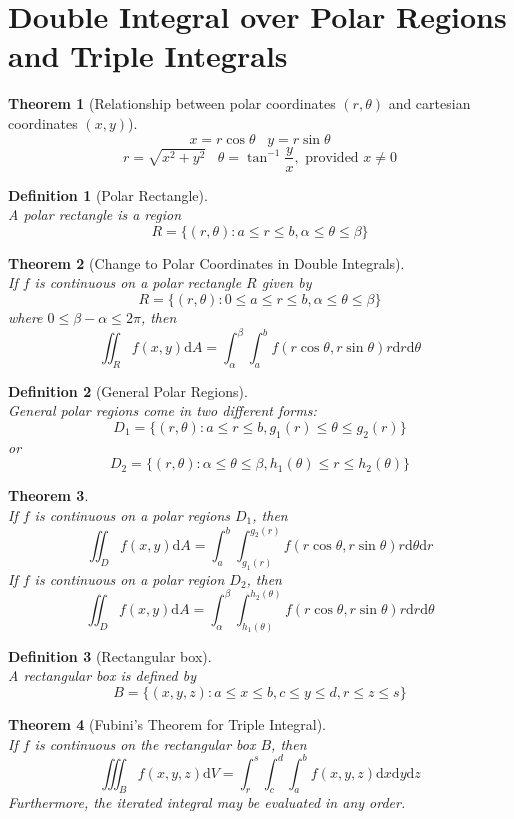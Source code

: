 \documentclass[12pt]{article}
\newtheorem{definition}{Definition}[section]
\newtheorem{theorem}{Theorem}[section]
\theoremstyle{definition}
\newcommand{\diff}{\mathrm{d}}
\begin{document}
\section{Double Integral over Polar Regions and Triple Integrals}
\begin{theorem}[Relationship between polar coordinates $(r,\theta)$ and cartesian coordinates $(x,y)$]
\[
x = r\cos\theta \;\;\; y = r\sin\theta
\]
\[r = \sqrt{x^2+y^2}\;\;\; \theta = \tan^{-1}\frac{y}{x},\text{ provided }x\neq 0
\]
\end{theorem}
\begin{definition}[Polar Rectangle]
\hfill\\\normalfont A polar rectangle is a region
\[
R=\{(r,\theta): a\leq r\leq b, \alpha\leq \theta\leq \beta\}
\]
\end{definition}
\begin{theorem}[Change to Polar Coordinates in Double Integrals]
\hfill\\\normalfont If $f$ is continuous on a polar rectangle $R$ given by
\[
R=\{(r,\theta): 0\leq a\leq r\leq b,\alpha\leq\theta\leq \beta\}
\]
where $0\leq \beta-\alpha\leq 2\pi$, then
\[
\iint_R f(x,y)\diff A = \int_\alpha^\beta\int_a^b f(r\cos\theta, r\sin\theta)r\diff r\diff \theta
\]
\end{theorem}
\begin{definition}[General Polar Regions]
\hfill\\\normalfont General polar regions come in two different forms:
\[
D_1=\{(r,\theta): a\leq r\leq b, g_1(r)\leq \theta\leq g_2(r)\}
\]
or
\[
D_2=\{(r,\theta): \alpha\leq \theta\leq \beta, h_1(\theta)\leq r\leq h_2(\theta)\}
\]
\end{definition}
\begin{theorem}\hfill\\\normalfont If $f$ is continuous on a polar regions $D_1$, then
\[
\iint_D f(x,y)\diff A = \int_a^b\int_{g_1(r)}^{g_2(r)} f(r\cos\theta,r\sin\theta)r\diff\theta\diff r
\]
If $f$ is continuous on a polar region $D_2$, then
\[
\iint_D f(x,y)\diff A = \int_\alpha^\beta\int_{h_1(\theta)}^{h_2(\theta)} f(r\cos\theta,r\sin\theta)r\diff r\diff \theta
\]
\end{theorem}
\begin{definition}[Rectangular box]
\hfill\\\normalfont A rectangular box is defined by
\[
B=\{(x,y,z):a\leq x\leq b, c\leq y\leq d, r\leq z\leq s\}
\]
\end{definition}
\begin{theorem}[Fubini's Theorem for Triple Integral]
\hfill\\\normalfont If $f$ is continuous on the rectangular box $B$, then
\[
\iiint_B f(x,y,z)\diff V = \int_r^s\int_c^d\int_a^b f(x,y,z)\diff x\diff y\diff z
\]
Furthermore, the iterated integral may be evaluated in any order.
\end{theorem}
\end{document}
